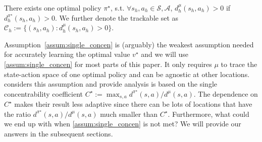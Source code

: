 \begin{assumption}\label{assum:single_concen}
	There exists one optimal policy $\pi^\star$, s.t. $\forall s_h,a_h\in\mathcal{S},\mathcal{A}$, $d^\mu_h(s_h,a_h)>0$ if $d^{\pi^\star}_h(s_h,a_h)>0$. We further denote the trackable set as $\mathcal{C}_h:=\{(s_h,a_h):d^\mu_h(s_h,a_h)>0\}$. 
\end{assumption}
 Assumption~\ref{assum:single_concen} is (arguably) the weakest assumption needed for accurately learning the optimal value $v^\star$ and we will use \ref{assum:single_concen} for most parts of this paper. It only requires $\mu$ to trace the state-action space of one optimal policy and can be agnostic at other locations. \cite{rashidinejad2021bridging,xie2021policy} considers this assumption and provide analysis is based on the single concentrability coefficient  $C^\star:=\max_{s,a}{d^{\pi^\star}(s,a)}/{d^\mu(s,a)}$. The dependence on $C^\star$ makes their result less adaptive since there can be lots of locations that have the ratio ${d^{\pi^\star}(s,a)}/{d^\mu(s,a)}$ much smaller than $C^\star$. Furthermore, what could we end up with when \ref{assum:single_concen} is not met? We will provide our answers in the subsequent sections. 







